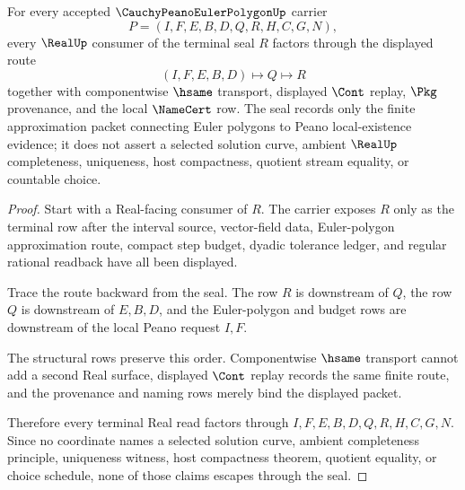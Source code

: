 \begin{theorem}
\label{thm:cauchy-peano-euler-polygon-real-seal-route}
For every accepted $\CauchyPeanoEulerPolygonUp$ carrier
$$
P=(I,F,E,B,D,Q,R,H,C,G,N),
$$
every $\RealUp$ consumer of the terminal seal $R$ factors through the displayed route
$$
(I,F,E,B,D)\longmapsto Q\longmapsto R
$$
together with componentwise $\hsame$ transport, displayed $\Cont$ replay, $\Pkg$ provenance, and the local $\NameCert$ row. The seal records only the finite approximation packet connecting Euler polygons to Peano local-existence evidence; it does not assert a selected solution curve, ambient $\RealUp$ completeness, uniqueness, host compactness, quotient stream equality, or countable choice.
\end{theorem}
\begin{proof}
Start with a Real-facing consumer of $R$. The carrier exposes $R$ only as the terminal row after the interval source, vector-field data, Euler-polygon approximation route, compact step budget, dyadic tolerance ledger, and regular rational readback have all been displayed.

Trace the route backward from the seal. The row $R$ is downstream of $Q$, the row $Q$ is downstream of $E,B,D$, and the Euler-polygon and budget rows are downstream of the local Peano request $I,F$.

The structural rows preserve this order. Componentwise $\hsame$ transport cannot add a second Real surface, displayed $\Cont$ replay records the same finite route, and the provenance and naming rows merely bind the displayed packet.

Therefore every terminal Real read factors through $I,F,E,B,D,Q,R,H,C,G,N$. Since no coordinate names a selected solution curve, ambient completeness principle, uniqueness witness, host compactness theorem, quotient equality, or choice schedule, none of those claims escapes through the seal.
\end{proof}



